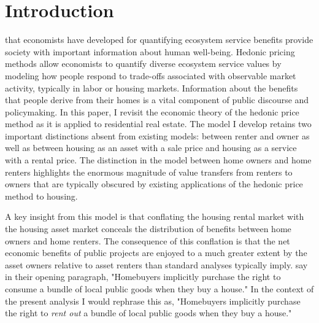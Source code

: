 \documentclass[ecta,nameyear,draft]{econsocart}
\theoremstyle{plain}
\theoremstyle{remark}
\begin{document}

\section{Introduction}
 that economists have developed for quantifying ecosystem service benefits provide society with important information about human well-being. Hedonic pricing methods allow economists to quantify diverse ecosystem service values by modeling how people respond to trade-offs associated with observable market activity, typically in labor or housing markets. Information about the benefits that people derive from their homes is a vital component of public discourse and policymaking. In this paper, I revisit the economic theory of the hedonic price method as it is applied to residential real estate. The model I develop retains two important distinctions absent from existing models: between renter and owner as well as between housing as an asset with a sale price and housing as a service with a rental price. The distinction in the model between home owners and home renters highlights the enormous magnitude of value transfers from renters to owners that are typically obscured by existing applications of the hedonic price method to housing.


A key insight from this model is that conflating the housing rental market with the housing asset market conceals the distribution of benefits between home owners and home renters. The consequence of this conflation is that the net economic benefits of public projects are enjoyed to a much greater extent by the asset owners relative to asset renters than standard analyses typically imply. \cite{kuminoffpope14} say in their opening paragraph, "Homebuyers implicitly purchase the right to consume a bundle of local public goods when they buy a house." In the context of the present analysis I would rephrase this as, "Homebuyers implicitly purchase the right to \textit{rent out} a bundle of local public goods when they buy a house."
\end{document}
